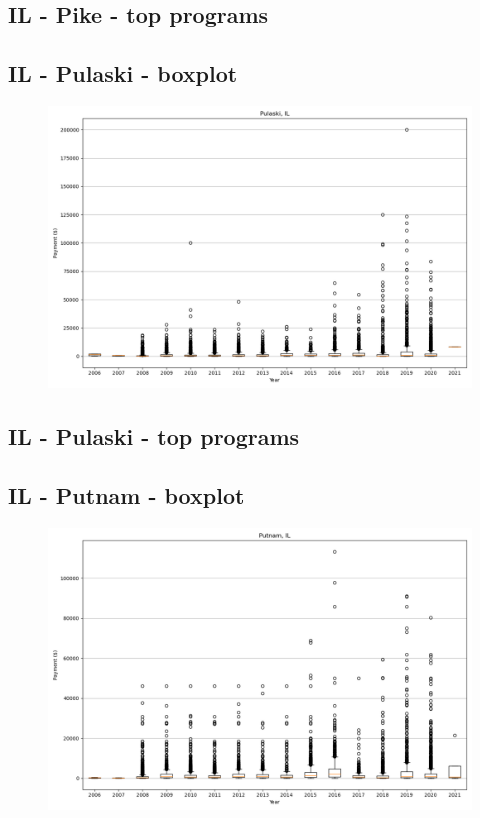 \subsection*{IL - Pike - top programs}

\newpage
\subsection*{IL - Pulaski - boxplot}
\begin{figure}[h]
\centering
\includegraphics[width=7in]{../output/boxplots/counties/Pulaski-IL_boxplot.png}
\end{figure}


\subsection*{IL - Pulaski - top programs}

\newpage
\subsection*{IL - Putnam - boxplot}
\begin{figure}[h]
\centering
\includegraphics[width=7in]{../output/boxplots/counties/Putnam-IL_boxplot.png}
\end{figure}


